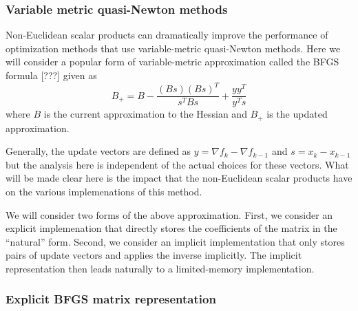 \subsubsection{Variable metric quasi-Newton methods}

Non-Euclidean scalar products can dramatically improve the performance of
optimization methods that use variable-metric quasi-Newton methods.  Here we
will consider a popular form of variable-metric approximation called the
BFGS formula [???] given as
%
\[
B_+ = B - \frac{(B s) (B s)^T}{s^T B s} + \frac{y y^T}{y^T s}
\label{eqn:bfgs_update}
\]
%
where $B$ is the current approximation to the Hessian and $B_+$ is the updated
approximation.

Generally, the update vectors are defined as $y = {}\nabla f_k - {}\nabla
f_{k-1}$ and $s = x_k - x_{k-1}$ but the analysis here is independent of the
actual choices for these vectors.  What will be made clear here is the impact
that the non-Euclidean scalar products have on the various implemenations of
this method.

We will consider two forms of the above approximation.  First, we consider an
explicit implemenation that directly stores the coefficients of the matrix in
the ``natural'' form.  Second, we consider an implicit implementation that
only stores pairs of update vectors and applies the inverse implicitly.  The
implicit representation then leads naturally to a limited-memory
implementation.

\subsubsection*{Explicit BFGS matrix representation}

